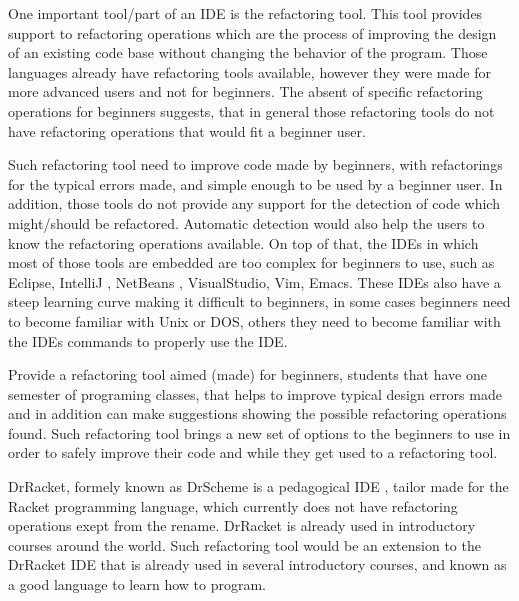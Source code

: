 One important tool/part of an IDE is the refactoring tool. This tool provides
support to refactoring operations which are the process of improving the design
of an existing code base \cite{fowler1999refactoring}
without changing the behavior of the program.
Those languages already have refactoring tools available, %
however they were made for more advanced users and not for beginners.
The absent of specific refactoring operations for beginners suggests, that in general %
those refactoring tools do not have refactoring operations that
would fit a beginner user.

Such refactoring tool need to improve code made by beginners, with refactorings for %
the typical errors made, and simple enough to be used by a beginner user.
In addition, those tools do not provide any support for the detection of code which might/should
be refactored.
Automatic detection would also help the users to know the refactoring operations available.
On top of that, the IDEs in which most of those tools are embedded are too complex for beginners
to use, such as Eclipse\cite{carlson2005eclipse}, IntelliJ \cite{bock2011intellij}, NetBeans \cite{boudreau2002netbeans},
 VisualStudio, Vim, Emacs.
These IDEs also have a steep learning curve making it difficult to beginners, in some %
cases beginners need to become familiar with Unix or DOS, others they need to
become familiar with the IDEs commands to properly use the IDE.

Provide a refactoring tool aimed (made) for beginners, students that have one semester %
of programing classes, that helps to improve typical design errors made and in addition can
make suggestions showing the possible refactoring operations found.
Such refactoring tool brings a new set of options to the beginners to use
in order to safely improve their code and while they get used to a refactoring tool.


DrRacket, formely known as DrScheme is a pedagogical IDE \cite{drscheme} \cite{drscheme_pegadogy},
tailor made for the Racket programming language, which currently does not
have refactoring operations exept from the rename.
DrRacket is already used in introductory courses around the world.
Such refactoring tool would be an extension to the DrRacket IDE that is already
used in several introductory courses, and known as a good language to learn how to program.


